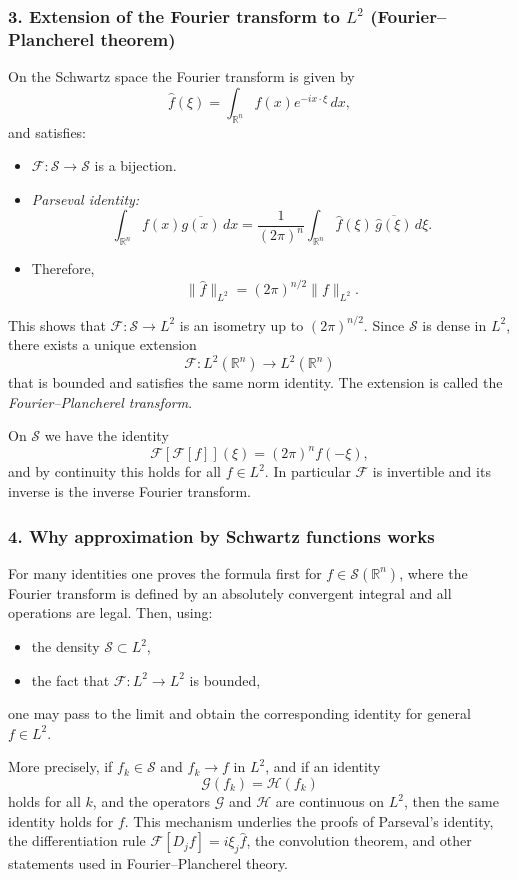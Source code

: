 \documentclass[12pt,a4paper]{article}
\theoremstyle{plain}
\theoremstyle{definition}
\theoremstyle{remark}
\theoremstyle{remark}
\begin{document}
\subsubsection*{3. Extension of the Fourier transform to $L^2$ (Fourier--Plancherel theorem)}

On the Schwartz space the Fourier transform is given by
\[
\widehat{f}(\xi)
= \int_{\mathbb{R}^n} f(x) e^{-ix\cdot\xi} \, dx,
\]
and satisfies:
\begin{itemize}
	\item $\mathcal{F}:\mathcal{S} \to \mathcal{S}$ is a bijection.
	\item \emph{Parseval identity:}
	\[
	\int_{\mathbb{R}^n} f(x)\overline{g(x)}\,dx
	= \frac{1}{(2\pi)^n}
	\int_{\mathbb{R}^n} \widehat{f}(\xi)\,
	\overline{\widehat{g}(\xi)}\,d\xi.
	\]
	\item Therefore,
	\[
	\|\widehat{f}\|_{L^2}
	= (2\pi)^{n/2} \|f\|_{L^2}.
	\]
\end{itemize}

This shows that $\mathcal{F}:\mathcal{S}\to L^2$ is an isometry up to
$(2\pi)^{n/2}$.  
Since $\mathcal{S}$ is dense in $L^2$, there exists a unique extension  
\[
\mathcal{F}: L^2(\mathbb{R}^n) \to L^2(\mathbb{R}^n)
\]
that is bounded and satisfies the same norm identity.  
The extension is called the \emph{Fourier--Plancherel transform}.

On $\mathcal{S}$ we have the identity
\[
\mathcal{F}[\mathcal{F}[f]](\xi) = (2\pi)^n f(-\xi),
\]
and by continuity this holds for all $f\in L^2$.  
In particular $\mathcal{F}$ is invertible and its inverse is the inverse Fourier
transform.

\subsubsection*{4. Why approximation by Schwartz functions works}

For many identities one proves the formula first for
$f\in\mathcal{S}(\mathbb{R}^n)$, where the Fourier transform is defined by an
absolutely convergent integral and all operations are legal.  
Then, using:
\begin{itemize}
	\item the density $\mathcal{S}\subset L^2$,
	\item the fact that $\mathcal{F}:L^2\to L^2$ is bounded,
\end{itemize}
one may pass to the limit and obtain the corresponding identity for general
$f\in L^2$.

More precisely, if $f_k\in\mathcal{S}$ and $f_k\to f$ in $L^2$, and if an
identity
\[
\mathcal{G}(f_k) = \mathcal{H}(f_k)
\]
holds for all $k$, and the operators $\mathcal{G}$ and $\mathcal{H}$ are
continuous on $L^2$, then the same identity holds for $f$.  
This mechanism underlies the proofs of Parseval's identity, the differentiation
rule $\mathcal{F}[D_j f]= i\xi_j \widehat{f}$, the convolution theorem, and
other statements used in Fourier--Plancherel theory.
\end{document}
